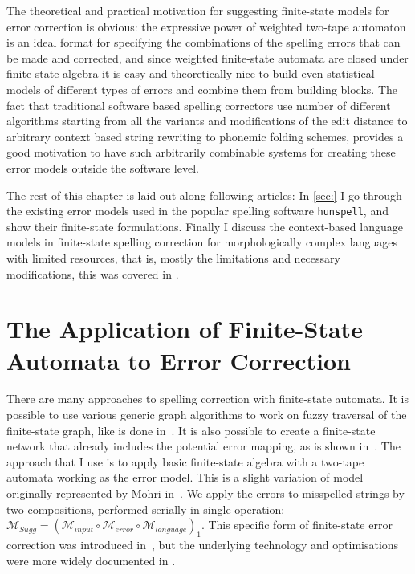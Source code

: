 \documentclass[officiallayout,draft]{unihelcompling}
\begin{document}
The theoretical and practical motivation for suggesting finite-state models for
error correction is obvious: the expressive power of weighted two-tape 
automaton is an ideal format for specifying the combinations of the
spelling errors that can be made and corrected, and since weighted
finite-state automata are closed under finite-state algebra it is easy
and theoretically nice to build even statistical models of different types
of errors and combine them from building blocks. The fact that traditional
software based spelling correctors use number of different algorithms starting
from all the variants and modifications of the edit distance to arbitrary
context based string rewriting to phonemic folding schemes, provides a good
motivation to have such arbitrarily combinable systems for creating these
error models outside the software level.

The rest of this chapter is laid out along following articles: In \ref{sec:} I
go through the existing error models used in the popular spelling software
\texttt{hunspell}, and show their finite-state formulations.  Finally I discuss
the context-based language models in finite-state spelling correction for
morphologically complex languages with limited resources, that is, mostly the
limitations and necessary modifications, this was covered in
\cite{pirinen2012cicling}. 

\section{The Application of Finite-State Automata to Error Correction}

There are many approaches to spelling correction with finite-state automata.
It is possible to use various generic graph algorithms to work on fuzzy
traversal of the finite-state graph, like is done in~\cite{hulden2007fast}.  It
is also possible to create a finite-state network that already includes the
potential error mapping, as is shown in~\cite{schulz200}. The approach that I
use is to apply basic finite-state algebra with a two-tape automata working as
the error model. This is a slight variation of model originally represented by
Mohri in~\cite{mohri2002edit}. We apply the errors to misspelled strings by two
compositions, performed serially in single operation: $\mathcal{M}_{Sugg} =
(\mathcal{M}_{input} \circ \mathcal{M}_{error} \circ
\mathcal{M}_{language})_1$.  This specific form of finite-state error
correction was introduced in~\cite{pirinen2009}, but the underlying technology
and optimisations were more widely documented in \cite{hfst2011}.
\end{document}
